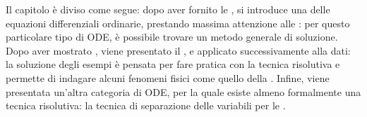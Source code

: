 \documentclass[letterpaper,10pt,italian]{jupyterBook}
\begin{document}
\sphinxAtStartPar
{}
Il capitolo è diviso come segue: dopo aver fornito le {\hyperref[\detokenize{ch/ode:ode-hs-def}]{}}, si introduce una {\hyperref[\detokenize{ch/ode:ode-hs-types}]{}} delle equazioni differenziali ordinarie, prestando massima attenzione alle {\hyperref[\detokenize{ch/ode:ode-hs-types-linear-const}]{}}: per questo particolare tipo di ODE, è possibile trovare un metodo generale di soluzione. Dopo aver mostrato {\hyperref[\detokenize{ch/ode:ode-hs-types-linear-const-ex}]{}}, viene presentato il {\hyperref[\detokenize{ch/ode:ode-hs-types-linear-const-sol}]{}}, e applicato successivamente alla {\hyperref[\detokenize{ch/ode:ode-hs-types-linear-const-ex-sol}]{}} dati: la soluzione degli esempi è pensata per fare pratica con la tecnica risolutiva e permette di indagare alcuni fenomeni fisici come quello della   . Infine, viene presentata un’altra categoria di ODE, per la quale esiste \sphinxhyphen{} almeno formalmente \sphinxhyphen{} una tecnica risolutiva: la tecnica di separazione delle variabili per le {\hyperref[\detokenize{ch/ode:ode-hs-types-separable}]{}}.
\end{document}
